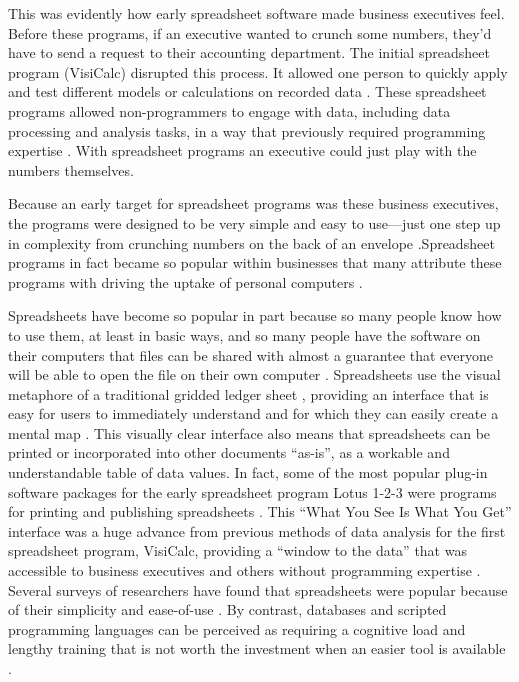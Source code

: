 \documentclass[]{tufte-book}
\begin{document}
This was evidently how early spreadsheet software made business executives feel.
Before these programs, if an executive wanted to crunch some numbers, they'd
have to send a request to their accounting department. The initial spreadsheet
program (VisiCalc) disrupted this process. It allowed one person to quickly
apply and test different models or calculations on recorded data
\citep{levy1984spreadsheet}. These spreadsheet programs allowed non-programmers to
engage with data, including data processing and analysis tasks, in a way that
previously required programming expertise \citep{levy1984spreadsheet}. With
spreadsheet programs an executive could just play with the numbers themselves.

Because an early target for spreadsheet programs was these business
executives, the programs were designed to be very simple and easy to use---just
one step up in complexity from crunching numbers on the back of an envelope
\citep{campbell2007number}.Spreadsheet programs in fact became so popular within
businesses that many attribute these programs with driving the uptake of
personal computers \citep{campbell2007number}.

Spreadsheets have become so popular in part because so many people know how to
use them, at least in basic ways, and so many people have the software on their
computers that files can be shared with almost a guarantee that everyone will be
able to open the file on their own computer \citep{hermans2016spreadsheets}.
Spreadsheets use the visual metaphore of a traditional gridded ledger sheet
\citep{levy1984spreadsheet}, providing an interface that is easy for users to
immediately understand and for which they can easily create a mental map
\citep{birch2018future, barga2011bioinformatics}. This visually clear interface also means that
spreadsheets can be printed or incorporated into other documents ``as-is'', as a
workable and understandable table of data values. In fact, some of the most
popular plug-in software packages for the early spreadsheet program Lotus 1-2-3
were programs for printing and publishing spreadsheets \citep{campbell2007number}.
This ``What You See Is What You Get'' interface was a huge advance from previous
methods of data analysis for the first spreadsheet program, VisiCalc, providing
a ``window to the data'' that was accessible to business executives and others
without programming expertise \citep{creeth1985microcomputer}. Several surveys of
researchers have found that spreadsheets were popular because of their
simplicity and ease-of-use \citep{anderson2007issues, altarawneh2017pilot, barga2011bioinformatics}. By contrast, databases and scripted programming
languages can be perceived as requiring a cognitive load and lengthy training
that is not worth the investment when an easier tool is available
\citep{hermans2016spreadsheets, anderson2007issues, myneni2010organization, barga2011bioinformatics, topaloglou2004biological}.
\end{document}
